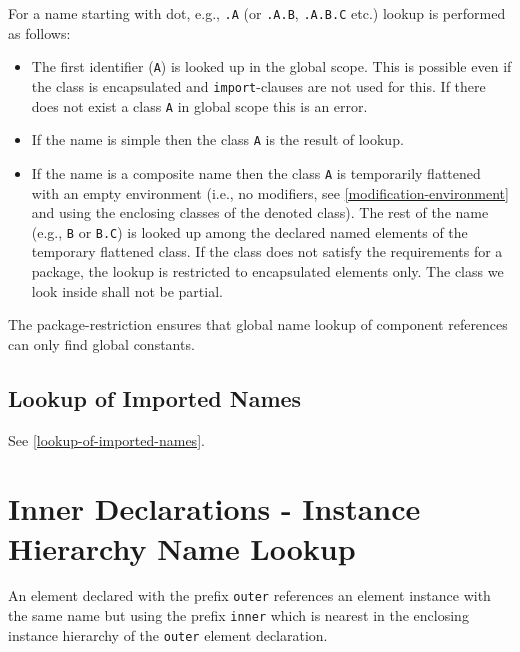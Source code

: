 For a name starting with dot, e.g., \lstinline!.A! (or \lstinline!.A.B!, \lstinline!.A.B.C! etc.) lookup is performed as follows:
\begin{itemize}
\item
  The first identifier (\lstinline!A!) is looked up in the global scope.
  This is possible even if the class is encapsulated and \lstinline!import!-clauses are not used for this.
  If there does not exist a class \lstinline!A! in global scope this is an error.
\item
  If the name is simple then the class \lstinline!A! is the result of lookup.
\item
  If the name is a composite name then the class \lstinline!A! is temporarily flattened with an empty environment (i.e., no modifiers, see \cref{modification-environment} and using the enclosing classes of the denoted class).
  The rest of the name (e.g., \lstinline!B! or \lstinline!B.C!) is looked up among the declared named elements of the temporary flattened class.
  If the class does not satisfy the requirements for a package, the lookup is restricted to encapsulated elements only.
  The class we look inside shall not be partial.
\end{itemize}

\begin{nonnormative}
The package-restriction ensures that global name lookup of component references can only find global constants.
\end{nonnormative}


\subsection{Lookup of Imported Names}\label{lookup-of-imported-names1}

See \cref{lookup-of-imported-names}.


\section{Inner Declarations - Instance Hierarchy Name Lookup}\label{instance-hierarchy-name-lookup-of-inner-declarations}\label{inner-declarations-instance-hierarchy-name-lookup}

An element declared with the prefix \lstinline!outer! references an element instance with the same name but using the prefix \lstinline!inner! which is nearest in the enclosing instance hierarchy of the \lstinline!outer! element declaration.

